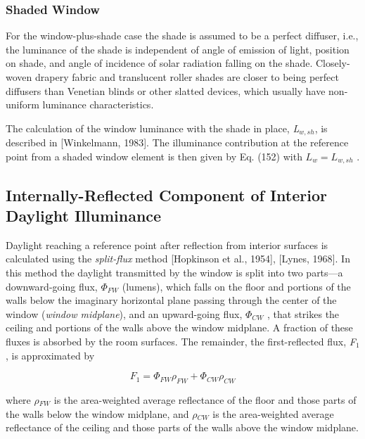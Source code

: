 \subsubsection{Shaded Window}\label{shaded-window}

For the window-plus-shade case the shade is assumed to be a perfect diffuser, i.e., the luminance of the shade is independent of angle of emission of light, position on shade, and angle of incidence of solar radiation falling on the shade. Closely-woven drapery fabric and translucent roller shades are closer to being perfect diffusers than Venetian blinds or other slatted devices, which usually have non-uniform luminance characteristics.

The calculation of the window luminance with the shade in place, \emph{L\(_{w,sh}\)}, is described in {[}Winkelmann, 1983{]}. The illuminance contribution at the reference point from a shaded window element is then given by Eq. (152) with \({L_w} = {L_{w,sh}}\) .

\subsection{Internally-Reflected Component of Interior Daylight Illuminance}\label{internally-reflected-component-of-interior-daylight-illuminance}

Daylight reaching a reference point after reflection from interior surfaces is calculated using the \emph{split-flux} method {[}Hopkinson et al., 1954{]}, {[}Lynes, 1968{]}. In this method the daylight transmitted by the window is split into two parts---a downward-going flux, \({\Phi_{FW}}\) (lumens), which falls on the floor and portions of the walls below the imaginary horizontal plane passing through the center of the window (\emph{window midplane}), and an upward-going flux, \({\Phi_{CW}}\) , that strikes the ceiling and portions of the walls above the window midplane. A fraction of these fluxes is absorbed by the room surfaces. The remainder, the first-reflected flux, \emph{F\(_{1}\)}, is approximated by

\begin{equation}
{F_1} = {\Phi_{FW}}{\rho_{FW}} + {\Phi_{CW}}{\rho_{CW}}
\end{equation}

where \emph{$\rho$\(_{FW}\)} is the area-weighted average reflectance of the floor and those parts of the walls below the window midplane, and \emph{$\rho$\(_{CW}\)} is the area-weighted average reflectance of the ceiling and those parts of the walls above the window midplane.

